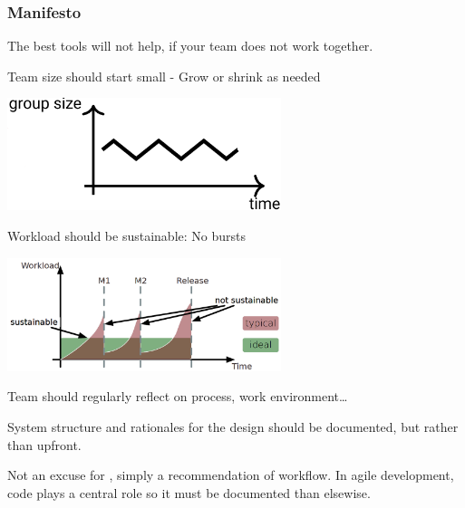 \documentclass[
    ../../Software_Engineering_Summary.tex,
]
{subfiles}
\begin{document}
\subsubsection{Manifesto}
\begin{defbox}
    The best tools will not help, if your team does not work together.

    \begin{minipage}
        [c]{0.4\textwidth}
        Team size should start small - Grow or shrink as needed
    \end{minipage}
    \begin{minipage}
        [c]{0.6\textwidth}
        \centering
        \includegraphics[width = 0.6\textwidth]{Pics/13/Manifesto1Groupsize.png}
    \end{minipage}

    \begin{minipage}
        [c]{0.4\textwidth}
        Workload should be sustainable: No bursts
    \end{minipage}
    \begin{minipage}
        [c]{0.6\textwidth}
        \centering
        \includegraphics[width = 0.6\textwidth]{Pics/13/Manifesto1Workload.png}
    \end{minipage}

    Team should regularly reflect on process, work environment\dots
\end{defbox}

\begin{defbox}
    System structure and rationales for the design should be documented, but  rather than upfront.

    Not an excuse for , simply a recommendation of workflow. In agile development, code plays a central role so it must be  documented than elsewise.
\end{defbox}
\end{document}
